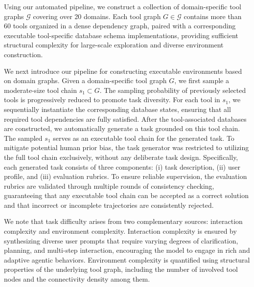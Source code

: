 \documentclass{article}
\begin{document}
Using our automated pipeline, we construct a collection of domain-specific tool graphs $\mathcal{G}$ covering over 20 domains. Each tool graph $G \in \mathcal{G}$ contains more than 60 tools organized in a dense dependency graph, paired with a corresponding executable tool-specific database schema implementations, providing sufficient structural complexity for large-scale exploration and diverse environment construction.

We next introduce our pipeline for constructing executable environments based on domain graphs.
Given a domain-specific tool graph $G$, we first sample a moderate-size tool chain $s_1 \subset G$.
The sampling probability of previously selected tools is progressively reduced to promote task diversity.
For each tool in $s_1$, we sequentially instantiate the corresponding database states, ensuring that all required tool dependencies are fully satisfied.
After the tool-associated databases are constructed, we automatically generate a task grounded on this tool chain. 
The sampled $s_1$ serves as an executable tool chain for the generated task.
To mitigate potential human prior bias, the task generator was restricted to utilizing the full tool chain exclusively, without any deliberate task design.
Specifically, each generated task consists of three components: (i) task description, (ii) user profile, and (iii) evaluation rubrics.
To ensure reliable supervision, the evaluation rubrics are validated through multiple rounds of consistency checking, guaranteeing that any executable tool chain can be accepted as a correct solution and that incorrect or incomplete trajectories are consistently rejected.

We note that task difficulty arises from two complementary sources: interaction complexity and environment complexity.
Interaction complexity is ensured by synthesizing diverse user prompts that require varying degrees of clarification, planning, and multi-step interaction, encouraging the model to engage in rich and adaptive agentic behaviors.
Environment complexity is quantified using structural properties of the underlying tool graph, including the number of involved tool nodes and the connectivity density among them.
\end{document}
